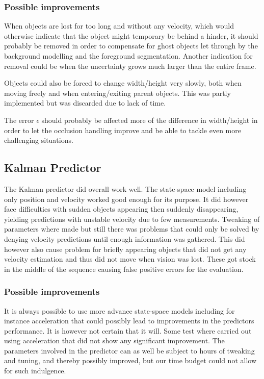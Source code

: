 \subsubsection{Possible improvements}
When objects are lost for too long and without any velocity, which would otherwise indicate that the object might temporary be behind a hinder, it should probably be removed in order to compensate for ghost objects let through by the background modelling and the foreground segmentation. Another indication for removal could be when the uncertainty grows much larger than the entire frame.

Objects could also be forced to change width/height very slowly, both when moving freely and when entering/exiting parent objects. This was partly implemented but was discarded due to lack of time.

The error $\epsilon$ should probably be affected more of the difference in width/height in order to let the occlusion handling improve and be able to tackle even more challenging situations.

\subsection{Kalman Predictor}
The Kalman predictor did overall work well. The state-space model including only position and velocity worked good enough for its purpose. It did however face difficulties with sudden objects appearing then suddenly disappearing, yielding predictions with unstable velocity due to few measurements. Tweaking of parameters
where made but still there was problems that could only be solved by denying velocity predictions until enough information was gathered. This did however also cause problem for briefly appearing objects that did not get any velocity estimation and thus did not move when vision was lost. These got stock in the middle of the sequence causing false positive errors for the evaluation.

\subsubsection{Possible improvements}
It is always possible to use more advance state-space models including for instance acceleration that could possibly lead to improvements in the predictors performance. It is however not certain that it will. Some test where carried out using acceleration that did not show any significant improvement. The parameters involved in the predictor can as well be subject to hours of tweaking and tuning, and thereby possibly improved, but our time budget could not allow for such indulgence. 















